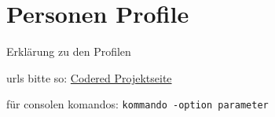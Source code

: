 \chapter{Personen Profile}  %
\label{chapter:Personen Profile}  %

Erklärung zu den Profilen

urls bitte so:
\href{http://codered.berlios.de}{Codered Projektseite}


für consolen komandos:
\verb|kommando -option parameter|

